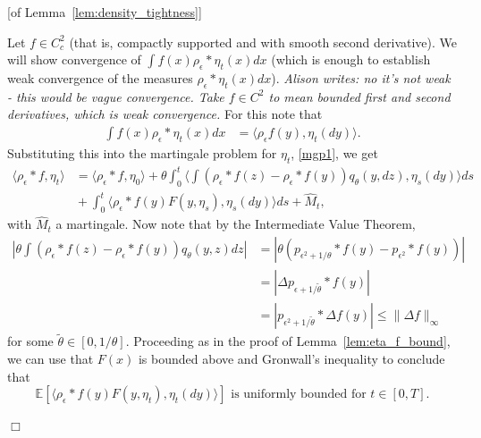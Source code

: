 \documentclass[12pt]{article}
\newenvironment {proof}{{\noindent\bf Proof }}{\hfill $\Box$ \medskip}
\def \tilde{\widetilde}
\newcommand{\IE}{\mathbb E}
\newcommand{\comment}[1]{{\color{blue} \it #1}}
\begin{document}
\begin{proof}[of Lemma~\ref{lem:density_tightness}]

    Let $f \in C_c^2$ (that is, compactly supported and with smooth second derivative).
    We will show convergence of $\int f(x) \rho_\epsilon * \eta_t(x) dx$ (which is enough to establish weak convergence of the measures $\rho_\epsilon * \eta_t(x) dx$).
    \comment{Alison writes: no it's not weak - this would be vague convergence. Take $f \in C^2$ to mean bounded first and second derivatives, which is weak convergence.}
    For this note that
    \begin{align*}
        \int f(x) \rho_\epsilon * \eta_t(x) dx
        &=
        \langle \rho_\epsilon f(y), \eta_t(dy) \rangle .
    \end{align*}
    Substituting this into the martingale problem for $\eta_t$, \eqref{mgp1},
    we get
    \begin{align}
         \label{MGPT_epsilon}
    \langle \rho_{\epsilon} * f, \eta_t \rangle
        & = \nonumber 
        \langle \rho_{\epsilon} * f, \eta_0 \rangle
        +
        \theta \int_0^t
            \langle
                \int (\rho_{\epsilon} * f(z) - \rho_{\epsilon} * f(y)) q_\theta(y, dz) ,
                \eta_s(dy)
            \rangle
        ds
        \\ & {}
        +
        \int_0^t \langle \rho_\epsilon * f(y) F(y, \eta_s), \eta_s(dy) \rangle ds
        + \widehat{M}_t,
    \end{align}
    with $\widehat{M}_t$ a martingale. Now note that
    by the Intermediate Value Theorem,
    \begin{align}
        \label{ShortBoundLaplacianHS}
        \left| \theta \int (\rho_{\epsilon} * f(z) - \rho_{\epsilon} * f(y)) q_\theta(y,z) dz \right|
        &=
        \left| \theta( p_{\epsilon^2 + 1/\theta} * f(y) - p_{\epsilon^2} * f(y) ) \right| \nonumber
        \\ &=
        \left| \Delta p_{\epsilon+1/\tilde{\theta}} * f(y) \right| \nonumber
        \\ &=
        \left| p_{\epsilon^2 + 1/\tilde{\theta}} * \Delta f(y) \right|
        \leq
        \| \Delta f \|_{\infty}
    \end{align}
    for some $\tilde{\theta} \in [0,1/\theta]$.
    Proceeding as in the proof of Lemma~\ref{lem:eta_f_bound},
    we can use that $F(x)$ is bounded above and Gronwall's inequality to conclude that
    \[
        \IE\left[\langle \rho_{\epsilon} * f(y) F(y, \eta_t), \eta_t(dy) \rangle \right]
        \text{ is uniformly bounded for } t \in [0,T].
    \]


\end{proof}
\end{document}
